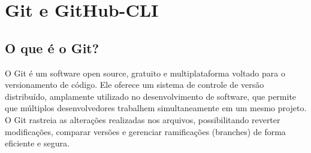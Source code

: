 \chapter{Git e GitHub-CLI}
\par
\section{O que é o Git?}
O Git é um software open source, gratuito e multiplataforma voltado para o versionamento de código. Ele oferece um sistema de controle de versão distribuído, amplamente utilizado no desenvolvimento de software, que permite que múltiplos desenvolvedores trabalhem simultaneamente em um mesmo projeto. O Git rastreia as alterações realizadas nos arquivos, possibilitando reverter modificações, comparar versões e gerenciar ramificações (branches) de forma eficiente e segura.
